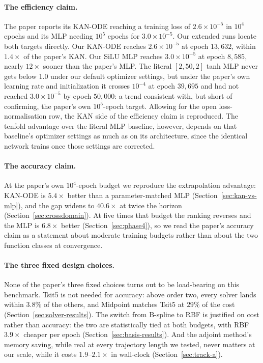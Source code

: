 \paragraph{The efficiency claim.} The paper reports its KAN-ODE reaching a
training loss of $2.6\times10^{-5}$ in $10^4$ epochs and its MLP needing
$10^5$ epochs for $3.0\times10^{-5}$. Our extended runs locate both targets
directly. Our KAN-ODE reaches $2.6\times10^{-5}$ at epoch $13{,}632$,
within $1.4\times$ of the paper's KAN. Our SiLU MLP reaches
$3.0\times10^{-5}$ at epoch $8{,}585$, nearly $12\times$ sooner than the
paper's MLP. The literal $[2,50,2]$ tanh MLP never gets below $1.0$ under
our default optimizer settings, but under the paper's own learning rate and
initialization it crosses $10^{-4}$ at epoch $39{,}695$ and had not reached
$3.0\times10^{-5}$ by epoch $50{,}000$: a trend consistent with, but short
of confirming, the paper's own $10^5$-epoch target. Allowing for the open
loss-normalisation row, the KAN side of the efficiency claim is reproduced.
The tenfold advantage over the literal MLP baseline, however, depends on
that baseline's optimizer settings as much as on its architecture, since the
identical network trains once those settings are corrected.

\paragraph{The accuracy claim.} At the paper's own $10^4$-epoch budget we
reproduce the extrapolation advantage: KAN-ODE is $5.4\times$ better than a
parameter-matched MLP (Section~\ref{sec:kan-vs-mlp}), and the gap widens to
$40.6\times$ at twice the horizon (Section~\ref{sec:crossdomain}). At five
times that budget the ranking reverses and the MLP is $6.8\times$ better
(Section~\ref{sec:phase4}), so we read the paper's accuracy claim as a
statement about moderate training budgets rather than about the two
function classes at convergence.

\paragraph{The three fixed design choices.} None of the paper's three fixed
choices turns out to be load-bearing on this benchmark. Tsit5 is not needed
for accuracy: above order two, every solver lands within $3.8\%$ of the
others, and Midpoint matches Tsit5 at $29\%$ of the cost
(Section~\ref{sec:solver-results}). The switch from B-spline to RBF is
justified on cost rather than accuracy: the two are statistically tied at
both budgets, with RBF $3.9\times$ cheaper per epoch
(Section~\ref{sec:basis-results}). And the adjoint method's memory saving,
while real at every trajectory length we tested, never matters at our
scale, while it costs $1.9$--$2.1\times$ in wall-clock
(Section~\ref{sec:track-a}).

